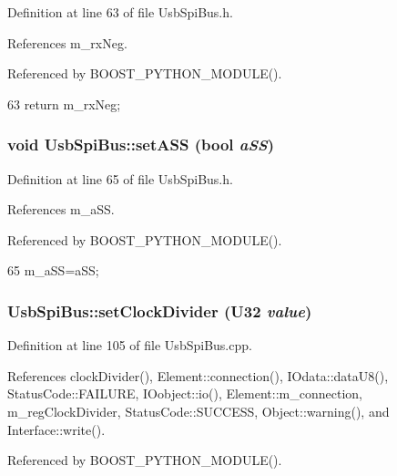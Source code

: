 Definition at line 63 of file UsbSpiBus.h.

References m\_\-rxNeg.

Referenced by BOOST\_\-PYTHON\_\-MODULE().


\begin{DoxyCode}
63 { return m_rxNeg; }
\end{DoxyCode}
\hypertarget{classUsbSpiBus_a1a0278c7994ba1fa84919383bd816047}{
\subsubsection[{setASS}]{\setlength{\rightskip}{0pt plus 5cm}void UsbSpiBus::setASS (bool {\em aSS})}}
\label{classUsbSpiBus_a1a0278c7994ba1fa84919383bd816047}


Definition at line 65 of file UsbSpiBus.h.

References m\_\-aSS.

Referenced by BOOST\_\-PYTHON\_\-MODULE().


\begin{DoxyCode}
65 { m_aSS=aSS; }
\end{DoxyCode}
\hypertarget{classUsbSpiBus_a8cd3c808e7b72d8bc0f1d85a774e8c99}{
\subsubsection[{setClockDivider}]{ UsbSpiBus::setClockDivider ({\bf U32} {\em value})}}
\label{classUsbSpiBus_a8cd3c808e7b72d8bc0f1d85a774e8c99}


Definition at line 105 of file UsbSpiBus.cpp.

References clockDivider(), Element::connection(), IOdata::dataU8(), StatusCode::FAILURE, IOobject::io(), Element::m\_\-connection, m\_\-regClockDivider, StatusCode::SUCCESS, Object::warning(), and Interface::write().

Referenced by BOOST\_\-PYTHON\_\-MODULE().


